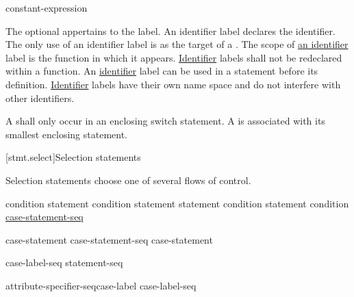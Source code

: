 \documentclass[ebook,10pt,oneside,openany,final]{memoir}
\begin{document}
\begin{bnf}
\br
     constant-expression\br
    \br
\end{bnf}

The optional  appertains to the label. An identifier label declares the identifier. The only use of an identifier label is as the target of a . The scope of \underline{an identifier} label is the function in which it appears. \underline{Identifier} labels shall not be redeclared within a function. An \underline{identifier} label can be used in a  statement before its definition. \underline{Identifier} labels have their own name space and do not interfere with other identifiers.

\begin{shaded}
\pnum
A  shall only occur in an enclosing switch statement.  A  is associated with its smallest enclosing  statement.
\end{shaded}

[stmt.select]{Selection statements}%

\pnum
Selection statements choose one of several flows of control.

%
\begin{bnf}
\br
     condition \terminal{)} statement\br
     condition \terminal{)} statement  statement\br
     condition \terminal{)} statement\br
     condition \terminal{) \{} \underline{case-statement-seq} \terminal{\}}\br
\end{bnf}

\begin{shaded}

\begin{bnf}
\br
    case-statement\br
    case-statement-seq case-statement\br
\end{bnf}

\begin{bnf}
\br
    case-label-seq statement-seq\br
\end{bnf}

\begin{bnf}
\br
    attribute-specifier-seq\opt case-label \terminal{:} case-label-seq\opt\br
\end{bnf}

\end{shaded}
\end{document}
